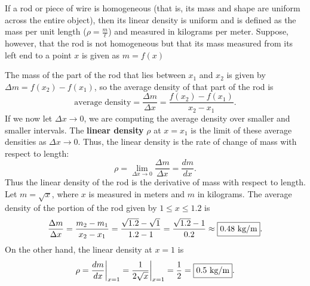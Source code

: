 \documentclass{book}
\begin{document}
\begin{Exam}\label{exam:density} If a rod or piece of wire is homogeneous (that is, its mass and shape are uniform across the entire object), then its linear density is uniform and is defined as the mass per unit length ($\rho = \frac{m}{\ell}$) and measured in kilograms per meter. Suppose, however, that the rod is not homogeneous but that its mass measured from its left end to a point $x$ is given as $m = f(x)$\pagebreak

\mbox{}\vspace{-85pt}

\begin{center}
\end{center}\vspace{-80pt}

The mass of the part of the rod that lies between $x_1$ and $x_2$ is given by $\Delta m = f(x_2) - f(x_1)$, so the average density of that part of the rod is 
\[\text{average density} = \dfrac{\Delta m}{\Delta x}  = \dfrac{f(x_2)-f(x_1)}{x_2-x_1}.\] If we now let $\Delta x \to 0$, we are computing the average density over smaller and smaller intervals. The \textbf{linear density} $\rho$ at $x=x_1$ is the limit of these average densities as $\Delta x \to 0$. Thus, the linear density is the rate of change of mass with respect to length: 
\[\rho = \lim_{\Delta x \to 0} \dfrac{\Delta m}{\Delta x} = \dfrac{dm}{dx}.\] Thus the linear density of the rod is the derivative of mass with respect to length.\\

Let $m = \sqrt{x}$, where $x$ is measured in meters and $m$ in kilograms. The average density of the portion of the rod given by $1\le x\le 1.2$ is 
\[\dfrac{\Delta m}{\Delta x} = \dfrac{m_2-m_1}{x_2-x_1} = \dfrac{\sqrt{1.2} - \sqrt{1}}{1.2-1} = \dfrac{\sqrt{1.2}-1}{0.2} \approx \fbox{$0.48\ \text{kg/m}$}.\] On the other hand, the linear density at $x=1$ is 
\[\rho = \dfrac{dm}{dx}\bigg\vert_{x=1} = \dfrac{1}{2\sqrt{x}}\bigg\vert_{x=1} = \dfrac{1}{2} = \fbox{$0.5\ \text{kg/m}$}. \]
\end{Exam}\vs
\end{document}
